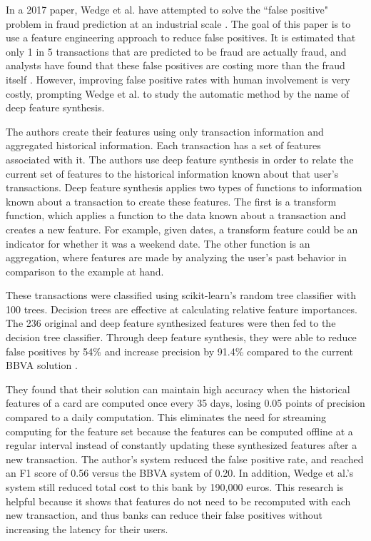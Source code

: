 \documentclass[midd]{thesis}
\begin{document}
In a 2017 paper, Wedge et al. have attempted to solve the ``false positive" problem in fraud prediction at an industrial scale \cite{Wedge}. The goal of this paper is to use a feature engineering approach to reduce false positives. It is estimated that only 1 in 5 transactions that are predicted to be fraud are actually fraud, and analysts have found that these false positives are costing more than the fraud itself \cite{Wedge}. However, improving false positive rates with human involvement is very costly, prompting Wedge et al. to study the automatic method by the name of deep feature synthesis.  

The authors create their features using only transaction information and aggregated historical information. Each transaction has a set of features associated with it. The authors use deep feature synthesis in order to relate the current set of features to the historical information known about that user's transactions. Deep feature synthesis applies two types of functions to information known about a transaction to create these features. The first is a transform function, which applies a function to the data known about a transaction and creates a new feature. For example, given dates, a transform feature could be an indicator for whether it was a weekend date. The other function is an aggregation, where features are made by analyzing the user's past behavior in comparison to the example at hand. 

These transactions were classified using scikit-learn's random tree classifier with 100 trees. Decision trees are effective at calculating relative feature importances. The 236 original and deep feature synthesized features were then fed to the decision tree classifier. Through deep feature synthesis, they were able to reduce false positives by 54\%  and increase precision by 91.4\% compared to the current BBVA solution \cite{Wedge}. 

They found that their solution can maintain high accuracy when the historical features of a card are computed once every 35 days, losing 0.05 points of precision compared to a daily computation. This eliminates the need for streaming computing for the feature set because the features can be computed offline at a regular interval instead of constantly updating these synthesized features after a new transaction. The author's system reduced the false positive rate, and reached an F1 score of 0.56 versus the BBVA system of 0.20. In addition, Wedge et al.'s system still reduced total cost to this bank by 190,000 euros. This research is helpful because it shows that features do not need to be recomputed with each new transaction, and thus banks can reduce their false positives without increasing the latency for their users.
\end{document}
